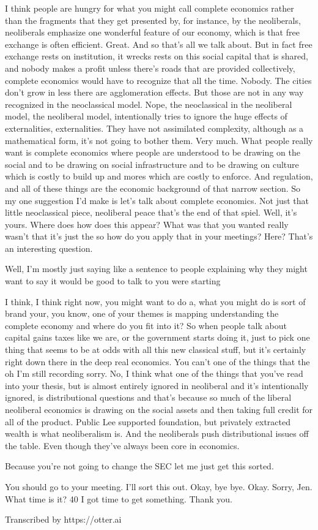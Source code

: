 


I think people are hungry for what you might call complete economics rather than the fragments that they get presented by, for instance, by the neoliberals, neoliberals emphasize one wonderful feature of our economy, which is that free exchange is often efficient. Great. And so that's all we talk about. But in fact free exchange rests on institution, it wrecks rests on this social capital that is shared, and nobody makes a profit unless there's roads that are provided collectively, complete economics would have to recognize that all the time. Nobody. The cities don't grow in less there are agglomeration effects. But those are not in any way recognized in the neoclassical model. Nope, the neoclassical in the neoliberal model, the neoliberal model, intentionally tries to ignore the huge effects of externalities, externalities. They have not assimilated complexity, although as a mathematical form, it's not going to bother them. Very much. What people really want is complete economics where people are understood to be drawing on the social and to be drawing on social infrastructure and to be drawing on culture which is costly to build up and mores which are costly to enforce. And regulation, and all of these things are the economic background of that narrow section. So my one suggestion I'd make is let's talk about complete economics. Not just that little neoclassical piece, neoliberal peace that's the end of that spiel. Well, it's yours. Where does how does this appear? What was that you wanted really wasn't that it's just the so how do you apply that in your meetings? Here? That's an interesting question.

Well, I'm mostly just saying like a sentence to people explaining why they might want to say it would be good to talk to you were starting

I think, I think right now, you might want to do a, what you might do is sort of brand your, you know, one of your themes is mapping understanding the complete economy and where do you fit into it? So when people talk about capital gains taxes like we are, or the government starts doing it, just to pick one thing that seems to be at odds with all this new classical stuff, but it's certainly right down there in the deep real economics. You can't one of the things that the oh I'm still recording sorry. No, I think what one of the things that you've read into your thesis, but is almost entirely ignored in neoliberal and it's intentionally ignored, is distributional questions and that's because so much of the liberal neoliberal economics is drawing on the social assets and then taking full credit for all of the product. Public Lee supported foundation, but privately extracted wealth is what neoliberalism is. And the neoliberals push distributional issues off the table. Even though they've always been core in economics.

Because you're not going to change the SEC let me just get this sorted.

You should go to your meeting. I'll sort this out. Okay, bye bye. Okay. Sorry, Jen. What time is it? 40 I got time to get something. Thank you.

Transcribed by https://otter.ai
